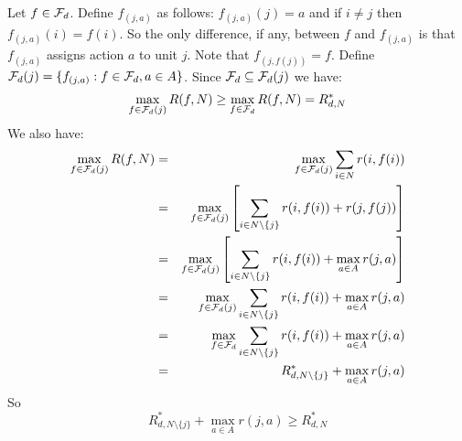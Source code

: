 \documentclass{article}
\begin{document}
Let $f \in {\cal F}_d$. Define $f_{(j,a)}$ as follows:
$f_{(j,a)}(j) = a$ and if $i\neq j$ then
$f_{(j,a)}(i) = f(i)$. So the only difference, if any, between $f$ and
$f_{(j,a)}$ is that $f_{(j,a)}$ assigns action $a$ to unit $j$.
Note that $f_{(j,f(j))} = f$.
Define ${\cal F}_d(j) = \{f_{(j,a)}: f \in {\cal
  F}_{d}, a \in A\}$. Since  ${\cal F}_d \subseteq {\cal F}_d(j)$
we have:
 \begin{equation}
   \label{eq:addfun}
  \max_{f \in {\cal F}_d(j)} R(f,N) \geq \max_{f \in {\cal F}_d}
  R(f,N) = R^{*}_{d,N}
\end{equation}
We also have:
\begin{eqnarray}
  \label{eq:addfun2}
  \max_{f \in {\cal F}_d(j)} R(f,N)
  & =
  &\max_{f \in {\cal F}_d(j)} \sum_{i \in N} r(i,f(i)) \\
  & =
  & \max_{f \in {\cal F}_d(j)} \left[   \sum_{i \in N \setminus
    \{j\} } r(i,f(i)) + r(j,f(j)) \right] \\
  & =
  & \max_{f \in {\cal F}_d(j)} \left[   \sum_{i \in N \setminus
    \{j\} } r(i,f(i)) + \max_{a
    \in A} r(j,a) \right] \\
  & = 
  & \max_{f \in
  {\cal F}_d(j)} \sum_{i \in N \setminus \{j\}} r(i,f(i)) +  \max_{a
    \in A} r(j,a) \\
  & = 
  & \max_{f \in
  {\cal F}_d} \sum_{i \in N \setminus \{j\}} r(i,f(i)) +  \max_{a
    \in A} r(j,a) \\
  & =
  & R^{*}_{d,N \setminus \{j\}} +  \max_{a
    \in A} r(j,a) 
\end{eqnarray}
So
\begin{equation}
  \label{eq:maineq}
  R^{*}_{d,N \setminus \{j\}} 
  +  \max_{a
    \in A} r(j,a) \geq   R^{*}_{d,N } 
\end{equation}
\end{document}
